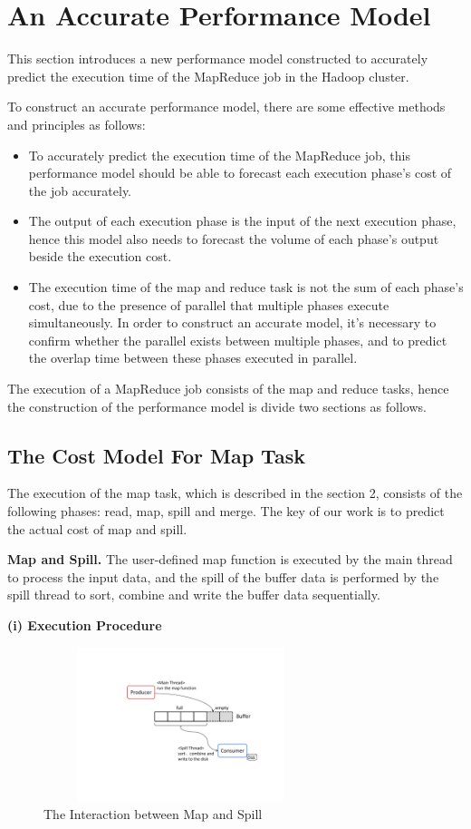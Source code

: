 \section{An Accurate Performance Model}
This section introduces a new performance model constructed to accurately predict the execution time of the MapReduce job in the Hadoop cluster.

To construct an accurate performance model, there are some effective methods and principles as follows:
\begin{itemize}
\item To accurately predict the execution time of the MapReduce job, this performance model should be able to forecast each execution phase's cost of the job accurately.
\item The output of each execution phase is the input of the next execution phase, hence this model also needs to forecast the volume of each phase's output beside the execution cost.
\item The execution time of the map and reduce task is not the sum of each phase's cost, due to the presence of parallel that multiple phases execute simultaneously. In order to construct an accurate model, it's necessary to confirm whether the parallel exists between multiple phases, and to predict the overlap time between these phases executed in parallel.
\end{itemize}

The execution of a MapReduce job consists of the map and reduce tasks, hence the construction of the performance model is divide two sections as follows.

\subsection{The Cost Model For Map Task}
The execution of the map task, which is described in the section 2, consists of the following phases: read, map, spill and merge. The key of our work is to predict the actual cost of map and spill.

\noindent\textbf{Map and Spill. }The user-defined map function is executed by the main thread to process the input data, and the spill of the buffer data is performed by the spill thread to sort, combine and write the buffer data sequentially.

\noindent\textbf{(i) Execution Procedure}
\begin{figure}[htbp]
\centering
\includegraphics[height=4.5cm, width=8cm]{mapandspill}
\caption{The Interaction between Map and Spill}
\end{figure}

